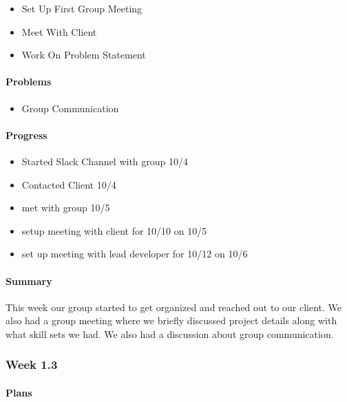 \documentclass[onecolumn, draftclsnofoot,10pt, compsoc]{article}
\begin{document}
		    \begin{itemize}
		        \item Set Up First Group Meeting
		        \item Meet With Client
		        \item Work On Problem Statement
		    \end{itemize}

		    \paragraph{Problems} \hfill \break

		    \begin{itemize}
		        \item Group Communication
		    \end{itemize}

		    \paragraph{Progress} \hfill \break
		    \begin{itemize}
		        \item Started Slack Channel with group 10/4
		        \item Contacted Client 10/4
		        \item met with group 10/5
		        \item setup meeting with client for 10/10 on 10/5
		        \item set up meeting with lead developer for 10/12 on 10/6
		    \end{itemize}

		    \paragraph{Summary} \hfill \break
		         This week our group started to get organized and reached out to our client. We also had a group meeting where we briefly discussed project details along with what skill sets we had. We also had a discussion about group communication.\\

		\subsubsection{Week 1.3}

		    \paragraph{Plans} \hfill \break
\end{document}
